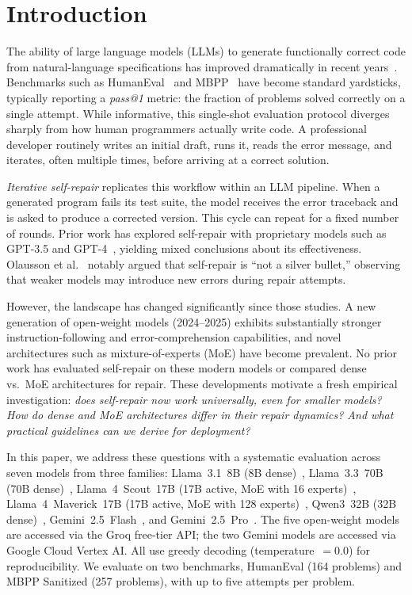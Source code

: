 \documentclass[conference]{IEEEtran}
\begin{document}
\section{Introduction}
\label{sec:introduction}

The ability of large language models (LLMs) to generate functionally correct code from natural-language specifications has improved dramatically in recent years~\cite{chen2021evaluating, li2022competition, roziere2024code}. Benchmarks such as HumanEval~\cite{chen2021evaluating} and MBPP~\cite{austin2021program} have become standard yardsticks, typically reporting a \emph{pass@1} metric: the fraction of problems solved correctly on a single attempt. While informative, this single-shot evaluation protocol diverges sharply from how human programmers actually write code. A professional developer routinely writes an initial draft, runs it, reads the error message, and iterates, often multiple times, before arriving at a correct solution.

\emph{Iterative self-repair} replicates this workflow within an LLM pipeline. When a generated program fails its test suite, the model receives the error traceback and is asked to produce a corrected version. This cycle can repeat for a fixed number of rounds. Prior work has explored self-repair with proprietary models such as GPT-3.5 and GPT-4~\cite{olausson2024selfrepair, chen2024teaching}, yielding mixed conclusions about its effectiveness. Olausson et al.~\cite{olausson2024selfrepair} notably argued that self-repair is ``not a silver bullet,'' observing that weaker models may introduce new errors during repair attempts.

However, the landscape has changed significantly since those studies. A new generation of open-weight models (2024--2025) exhibits substantially stronger instruction-following and error-comprehension capabilities, and novel architectures such as mixture-of-experts (MoE) have become prevalent. No prior work has evaluated self-repair on these modern models or compared dense vs.\ MoE architectures for repair. These developments motivate a fresh empirical investigation: \emph{does self-repair now work universally, even for smaller models? How do dense and MoE architectures differ in their repair dynamics? And what practical guidelines can we derive for deployment?}

In this paper, we address these questions with a systematic evaluation across seven models from three families: Llama~3.1~8B (8B dense)~\cite{grubisic2024llama3}, Llama~3.3~70B (70B dense)~\cite{llama33}, Llama~4~Scout~17B (17B active, MoE with 16 experts)~\cite{llama4}, Llama~4~Maverick~17B (17B active, MoE with 128 experts)~\cite{llama4}, Qwen3~32B (32B dense)~\cite{qwen3}, Gemini~2.5~Flash~\cite{gemini2025}, and Gemini~2.5~Pro~\cite{gemini2025}. The five open-weight models are accessed via the Groq free-tier API; the two Gemini models are accessed via Google Cloud Vertex AI. All use greedy decoding (temperature~$=0.0$) for reproducibility. We evaluate on two benchmarks, HumanEval (164 problems) and MBPP Sanitized (257 problems), with up to five attempts per problem.
\end{document}
